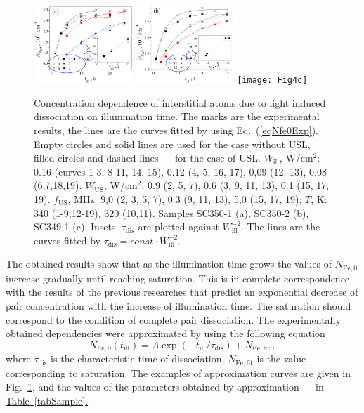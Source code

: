 \documentclass[%
 aip,jap,
 amsmath,amssymb,
 reprint,%
]{revtex4-1}
\begin{document}
\begin{figure}
\includegraphics[width=0.33\textwidth]{Fig4a}%
\includegraphics[width=0.33\textwidth]{Fig4b}%
\texttt{[image: Fig4c]}%
\caption{\label{Fig:Nfe_till}
Concentration dependence of interstitial atoms due to light induced dissociation on illumination time.
The marks are the experimental results, the lines are the curves  fitted by using Eq.~(\ref{eqNfe0Exp}).
Empty circles and solid lines are used for  the case without USL,
filled circles and dashed lines --- for the case of USL.
$W_\mathrm{ill}$, W/cm$^2$: 0.16 (curves 1-3, 8-11, 14, 15),
0.12 (4, 5, 16, 17), 0,09 (12, 13), 0.08 (6,7,18,19).
$W_\mathrm{US}$, W/cm$^2$:
0.9 (2, 5, 7), 0.6 (3, 9, 11, 13), 0.1 (15, 17, 19).
$f_\mathrm{US}$, MHz:
9,0 (2, 3, 5, 7), 0.3 (9, 11, 13), 5,0 (15, 17, 19);
$T$, K:
340 (1-9,12-19), 320 (10,11).
Samples SC350-1 (a), SC350-2 (b), SC349-1 (c).
Insets: $\tau_\mathrm{dis}$ are plotted against $W_\mathrm{ill}^{-2}$.
The lines are the curves fitted by $\tau_\mathrm{dis}=const\cdot W_\mathrm{ill}^{-2}$.
}
\end{figure}


The obtained results show that as the illumination time grows
the values of $N_\mathrm{Fe,0}$ increase gradually until reaching saturation.
This is in complete correspondence with the results of the previous researches \cite{FeBLight2,FeBAssJAP2014,FeBKin2019}
that predict an exponential decrease of pair concentration with the increase of illumination time.
The saturation should correspond to the condition of complete pair dissociation.
The experimentally obtained dependencies were approximated by using the following equation
\begin{equation}
\label{eqNfe0Exp}
N_\mathrm{Fe,0}(t_\mathrm{ill})=A\exp(-t_\mathrm{ill}/\tau_\mathrm{dis})
+N_\mathrm{Fe,fit}\,,
\end{equation}
where
$\tau_\mathrm{dis}$ is the characteristic time of dissociation,
$N_\mathrm{Fe,fit}$ is the value corresponding to saturation.
The examples of approximation curves are given in Fig.~\ref{Fig:Nfe_till},
and the values of the parameters obtained by approximation --- in
\textcolor[rgb]{0.00,0.07,1.00}{\uline{
Table~\ref{tabSample}.}}
\end{document}
